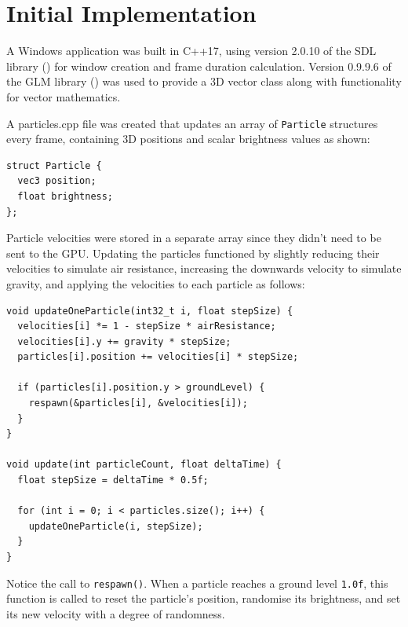\documentclass[11pt, a4paper, twocolumn]{article}
\begin{document}
\section{Initial Implementation}


A Windows application was built in C++17, using version 2.0.10 of the SDL library (\citeyear{SDL2}) for window creation and frame duration calculation. Version 0.9.9.6 of the GLM library (\citeyear{GLM}) was used to provide a 3D vector class along with functionality for vector mathematics.

A particles.cpp file was created that updates an array of \verb|Particle| structures every frame, containing 3D positions and scalar brightness values as shown:

\begin{verbatim}
struct Particle {
  vec3 position;
  float brightness;
};
\end{verbatim}

Particle velocities were stored in a separate array since they didn't need to be sent to the GPU. Updating the particles functioned by slightly reducing their velocities to simulate air resistance, increasing the downwards velocity to simulate gravity, and applying the velocities to each particle as follows:

\begin{verbatim}
void updateOneParticle(int32_t i, float stepSize) {
  velocities[i] *= 1 - stepSize * airResistance;
  velocities[i].y += gravity * stepSize;
  particles[i].position += velocities[i] * stepSize;

  if (particles[i].position.y > groundLevel) {
    respawn(&particles[i], &velocities[i]);
  }
}

void update(int particleCount, float deltaTime) {
  float stepSize = deltaTime * 0.5f;

  for (int i = 0; i < particles.size(); i++) {
    updateOneParticle(i, stepSize);
  }
}
\end{verbatim}

Notice the call to \verb|respawn()|. When a particle reaches a ground level \verb|1.0f|, this function is called to reset the particle's position, randomise its brightness, and set its new velocity with a degree of randomness.
\end{document}

